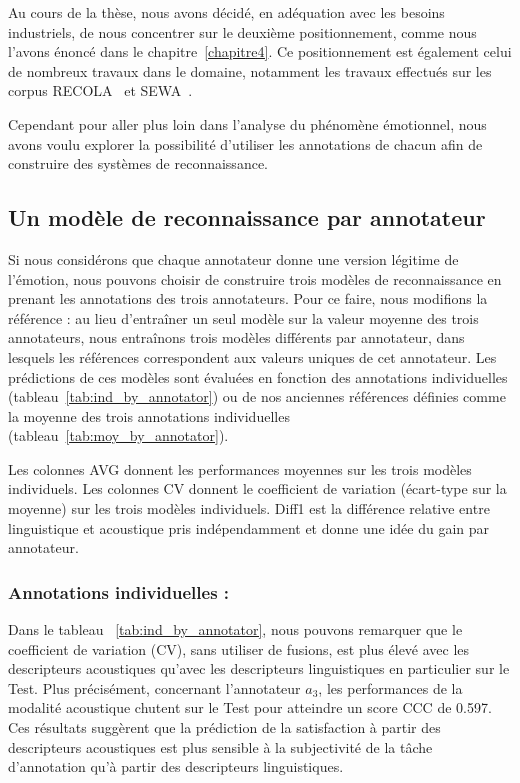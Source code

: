 Au cours de la thèse, nous avons décidé, en adéquation avec les besoins industriels, de nous concentrer sur le deuxième positionnement, comme nous l'avons énoncé dans le chapitre~\ref{chapitre4}. Ce positionnement est également celui de nombreux travaux dans le domaine, notamment les travaux effectués sur les corpus RECOLA~\cite{Ringeval2013} et SEWA~\cite{SEWA}.

Cependant pour aller plus loin dans l'analyse du phénomène émotionnel, nous avons voulu explorer la possibilité d'utiliser les annotations de chacun afin de construire des systèmes de reconnaissance.

\subsection{Un modèle de reconnaissance par annotateur}
Si nous considérons que chaque annotateur donne une version légitime de l'émotion, nous pouvons choisir de construire trois modèles de reconnaissance en prenant les annotations des trois annotateurs. Pour ce faire, nous modifions la référence : au lieu d'entraîner un seul modèle sur la valeur moyenne des trois annotateurs, nous entraînons trois modèles différents par annotateur, dans lesquels les références correspondent aux valeurs uniques de cet annotateur.
Les prédictions de ces modèles sont évaluées en fonction des annotations individuelles (tableau~\ref{tab:ind_by_annotator}) ou de nos anciennes références définies comme la moyenne des trois annotations individuelles (tableau~\ref{tab:moy_by_annotator}).

Les colonnes AVG donnent les performances moyennes sur les trois modèles individuels. Les colonnes CV donnent le coefficient de variation (écart-type sur la moyenne) sur les trois modèles individuels. Diff1 est la différence relative entre linguistique et acoustique pris indépendamment et donne une idée du gain par annotateur.

\subsubsection{Annotations individuelles : }



Dans le tableau ~\ref{tab:ind_by_annotator}, nous pouvons remarquer que le coefficient de variation (CV), sans utiliser de fusions, est plus élevé avec les descripteurs acoustiques qu'avec les descripteurs linguistiques en particulier sur le Test. Plus précisément, concernant l'annotateur $a_3$, les performances de la modalité acoustique chutent sur le Test pour atteindre un score CCC de 0.597.
Ces résultats suggèrent que la prédiction de la satisfaction à partir des descripteurs acoustiques est plus sensible à la subjectivité de la tâche d'annotation qu'à partir des descripteurs linguistiques.

